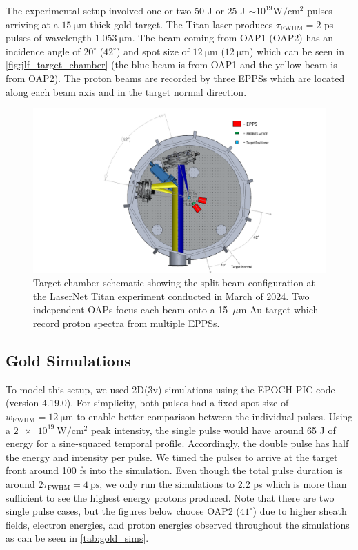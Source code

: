 The experimental setup involved one or two $50$ J or $25$ J $\sim 10^{19} \unit{\watt \per \centi \meter \squared}$ pulses arriving at a $\SI{15}{\micro \meter}$ thick gold target. The Titan laser produces $\tau_\text{FWHM} = 2$ ps pulses of wavelength $\SI{1.053}{\micro \meter}$. The beam coming from \gls{OAP}1 (\gls{OAP}2) has an incidence angle of $20^\circ$ ($42^\circ$) and spot size of $\SI{12}{\micro \meter}$ ($\SI{12}{\micro \meter}$) which can be seen in \autoref{fig:jlf_target_chamber} (the blue beam is from OAP1 and the yellow beam is from OAP2). The proton beams are recorded by three \gls{EPPS}s which are located along each beam axis and in the target normal direction.

\begin{figure}
	\centering
	\includegraphics[width=.95\linewidth]{planning/images/titan/target_area_JLF.pdf}
	\caption{Target chamber schematic showing the split beam configuration at the LaserNet Titan experiment conducted in March of 2024. Two independent \gls{OAP}s focus each beam onto a 15~$\mu$m Au target which record proton spectra from multiple \gls{EPPS}s.}
	\label{fig:jlf_target_chamber}
\end{figure}

\subsection{Gold Simulations}

To model this setup, we used 2D(3v) simulations using the EPOCH \gls{PIC} code (version 4.19.0). For simplicity, both pulses had a fixed spot size of $w_\text{FWHM} = \SI{12}{\micro \meter}$ to enable better comparison between the individual pulses. Using a $\SI{2e19}{\watt \per \centi \meter \squared}$ peak intensity, the single pulse would have around 65 J of energy for a sine-squared temporal profile. Accordingly, the double pulse has half the energy and intensity per pulse. We timed the pulses to arrive at the target front around 100 fs into the simulation. Even though the total pulse duration is around $2 \tau_\text{FWHM} = \SI{4}{\pico \second}$, we only run the simulations to 2.2 ps which is more than sufficient to see the highest energy protons produced. Note that there are two single pulse cases, but the figures below choose \gls{OAP}2 ($41^\circ$) due to higher sheath fields, electron energies, and proton energies observed throughout the simulations as can be seen in \autoref{tab:gold_sims}.

